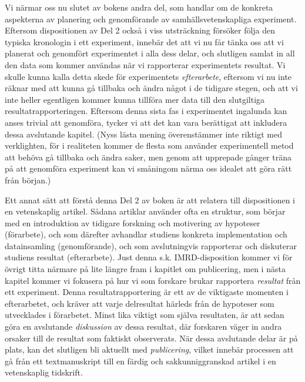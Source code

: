 \documentclass[
]{book}
\begin{document}
Vi närmar oss nu slutet av bokens andra del, som handlar om de konkreta aspekterna av planering och genomförande av samhällsvetenskapliga experiment. Eftersom dispositionen av Del 2 också i viss utsträckning försöker följa den typiska kronologin i ett experiment, innebär det att vi nu får tänka oss att vi planerat och genomfört experimentet i alla dess delar, och slutligen samlat in all den data som kommer användas när vi rapporterar experimentets resultat. Vi skulle kunna kalla detta skede för experimentets \emph{efterarbete}, eftersom vi nu inte räknar med att kunna gå tillbaka och ändra något i de tidigare stegen, och att vi inte heller egentligen kommer kunna tillföra mer data till den slutgiltiga resultatrapporteringen. Eftersom denna sista fas i experimentet ingalunda kan anses trivial att genomföra, tycker vi att det kan vara berättigat att inkludera dessa avslutande kapitel. (Nyss lästa mening överenstämmer inte riktigt med verklighten, för i realiteten kommer de flesta som använder experimentell metod att behöva gå tillbaka och ändra saker, men genom att upprepade gånger träna på att genomföra experiment kan vi småningom närma oss idealet att göra rätt från början.)

Ett annat sätt att förstå denna Del 2 av boken är att relatera till dispositionen i en vetenskaplig artikel. Sådana artiklar använder ofta en struktur, som börjar med en introduktion av tidigare forskning och motivering av hypoteser (förarbete), och som därefter avhandlar studiens konkreta implementation och datainsamling (genomförande), och som avslutningvis rapporterar och diskuterar studiens resultat (efterarbete). Just denna s.k. IMRD-disposition kommer vi för övrigt titta närmare på lite längre fram i kapitlet om publicering, men i nästa kapitel kommer vi fokusera på hur vi som forskare brukar rapportera \emph{resultat} från ett experiment. Denna resultatrapportering är ett av de viktigaste momenten i efterarbetet, och kräver att varje delresultat härleds från de hypoteser som utvecklades i förarbetet. Minst lika viktigt som själva resultaten, är att sedan göra en avslutande \emph{diskussion} av dessa resultat, där forskaren väger in andra orsaker till de resultat som faktiskt observerats. När dessa avslutande delar är på plats, kan det slutligen bli aktuellt med \emph{publicering}, vilket innebär processen att gå från ett textmanuskript till en färdig och sakkunniggranskad artikel i en vetenskaplig tidskrift.
\end{document}
